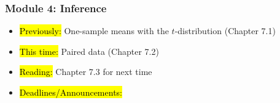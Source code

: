 
\begin{frame}
    \frametitle{Module 4: Inference}
    \begin{itemize}
        \item \hl{Previously: }One-sample means with the $t$-distribution (Chapter 7.1)
        \item \hl{This time: }Paired data (Chapter 7.2)
        \item \hl{Reading: }Chapter 7.3 for next time
        \item \hl{Deadlines/Announcements: }
    \end{itemize}
    
\end{frame}